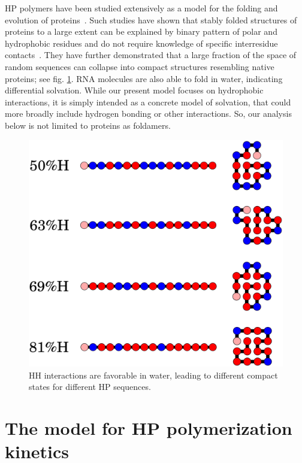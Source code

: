 \documentclass[journal=jacsat,manuscript=article,layout=twocolumn]{achemso}
\begin{document}
HP polymers have been studied extensively as a model for the folding and 
evolution of proteins~\cite{lau1989lattice,Chan1991,Miller1995,Yue1995,agarwala1997local}.  Such 
studies have shown that stably folded structures of proteins to a large extent can be explained by 
binary pattern of polar and hydrophobic residues and do not require knowledge of specific 
interresidue contacts~\cite{Yue1992,Xiong1995,Fisher2011}. They have further demonstrated that 
a large fraction of the space of random sequences can 
collapse into compact structures resembling native proteins\cite{lau1989lattice}; see fig. 
\ref{fig:hydro-effect}.  RNA molecules are also able to fold in water, indicating differential 
solvation.  While our present model focuses on hydrophobic interactions, it is simply intended as a 
concrete model of solvation, that could more broadly include hydrogen bonding or other interactions. 
 So, our analysis below is not limited to proteins as foldamers.

\begin{figure}[h!]
  \centering
  \includegraphics[width=\columnwidth]{pictures/tst-seqs.pdf} 
  \caption{HH interactions are favorable in water, leading to different 
compact states for different 
HP sequences.}
  \label{fig:hydro-effect}
\end{figure}


\section{The model for HP polymerization kinetics}
\end{document}
